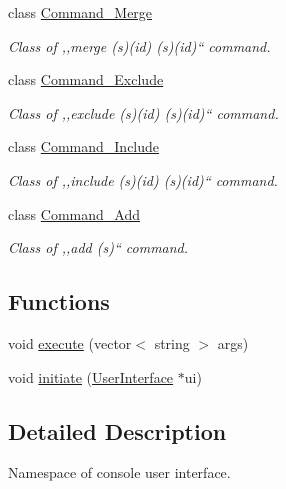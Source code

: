 \begin{DoxyCompactItemize}
class \hyperlink{classuiconsole_1_1Command__Merge}{Command\_\-Merge}
\begin{DoxyCompactList}\small\item\em Class of ,,merge (s)(id) (s)(id)`` command. \item\end{DoxyCompactList}\item 
class \hyperlink{classuiconsole_1_1Command__Exclude}{Command\_\-Exclude}
\begin{DoxyCompactList}\small\item\em Class of ,,exclude (s)(id) (s)(id)`` command. \item\end{DoxyCompactList}\item 
class \hyperlink{classuiconsole_1_1Command__Include}{Command\_\-Include}
\begin{DoxyCompactList}\small\item\em Class of ,,include (s)(id) (s)(id)`` command. \item\end{DoxyCompactList}\item 
class \hyperlink{classuiconsole_1_1Command__Add}{Command\_\-Add}
\begin{DoxyCompactList}\small\item\em Class of ,,add (s)`` command. \item\end{DoxyCompactList}\end{DoxyCompactItemize}
\subsection*{Functions}
\begin{DoxyCompactItemize}
\item 
void \hyperlink{namespaceuiconsole_a40263e63a42257769b2fb9a95fd771c1}{execute} (vector$<$ string $>$ args)
\item 
void \hyperlink{namespaceuiconsole_a037fc32900a055adc36892666b385f30}{initiate} (\hyperlink{classUserInterface}{UserInterface} $\ast$ui)
\end{DoxyCompactItemize}


\subsection{Detailed Description}
Namespace of console user interface. 

